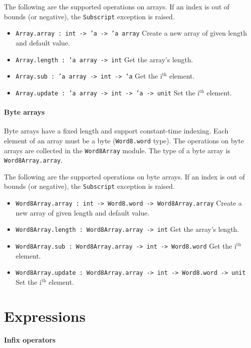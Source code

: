 \documentclass[12pt,a4paper]{book}
\begin{document}
The following are the supported operations on arrays. If an index is out of bounds (or negative), the \texttt{Subscript} exception is raised.
\begin{itemize}
\item \texttt{Array.array : int -> 'a -> 'a array} Create a new array of given length and default value.
\item \texttt{Array.length : 'a array -> int} Get the array's length.
\item \texttt{Array.sub : 'a array -> int -> 'a} Get the i$^\textrm{th}$ element.
\item \texttt{Array.update : 'a array -> int -> 'a -> unit} Set the i$^\textrm{th}$ element.
\end{itemize}


\paragraph{Byte arrays}
Byte arrays have a fixed length and support constant-time indexing. Each element of an array must be a byte (\texttt{Word8.word} type). The operations on byte arrays are collected in the \texttt{Word8Array} module. The type of a byte array is \texttt{Word8Array.array}.

The following are the supported operations on byte arrays. If an index is out of bounds (or negative), the \texttt{Subscript} exception is raised.
\begin{itemize}
\item \texttt{Word8Array.array : int -> Word8.word -> Word8Array.array} Create a new array of given length and default value.
\item \texttt{Word8Array.length : Word8Array.array -> int} Get the array's length.
\item \texttt{Word8Array.sub : Word8Array.array -> int -> Word8.word} Get the i$^\textrm{th}$ element.
\item \texttt{Word8Array.update : Word8Array.array -> int -> Word8.word -> unit} Set the i$^\textrm{th}$ element.
\end{itemize}

\section{Expressions}
\label{expressions}

\paragraph{Infix operators}
\end{document}
